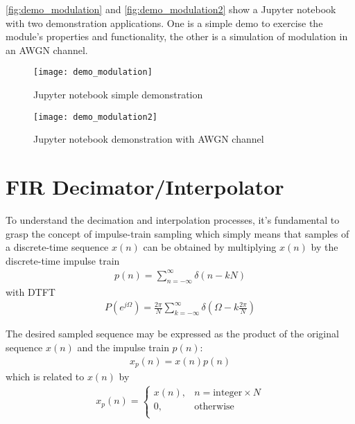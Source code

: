\autoref{fig:demo_modulation} and \autoref{fig:demo_modulation2} show a Jupyter notebook with two demonstration applications. One is a simple demo to exercise the module's properties and functionality, the other is a simulation of modulation in an AWGN channel.

\begin{figure}[H]
  \centering
  \texttt{[image: demo\_modulation]}
  \caption{ Jupyter notebook simple demonstration}
  \label{fig:demo_modulation}
\end{figure}

\begin{figure}[H]
  \centering
  \texttt{[image: demo\_modulation2]}
  \caption{ Jupyter notebook demonstration with AWGN channel}
  \label{fig:demo_modulation2}
\end{figure}

\section{FIR Decimator/Interpolator}

To understand the decimation and interpolation processes, it's fundamental to grasp the concept of impulse-train sampling which simply means that samples of a discrete-time sequence $x(n)$ can be obtained by multiplying $x(n)$ by the discrete-time impulse train
\begin{align}
  p(n)=\sum_{n=-\infty}^{\infty}\delta(n-kN)
\end{align}
with DTFT
\begin{align}
  P(e^{j\Omega})=\frac{2\pi}{N}\sum_{k=-\infty}^{\infty}\delta\left(\Omega-k\frac{2\pi}{N}\right)
\end{align}

The desired sampled sequence may be expressed as the product of the original sequence $x(n)$ and the impulse train $p(n)$:
\begin{align} \label{eq:x_pn}
  x_p(n) = x(n)p(n)
\end{align}
which is related to $x(n)$ by
\begin{align} \label{eq:x_p}
  x_p(n) =
  \begin{cases}
    x(n), & n=\text{integer} \times N\\
    0,    & \text{otherwise}\\
  \end{cases}
\end{align}

